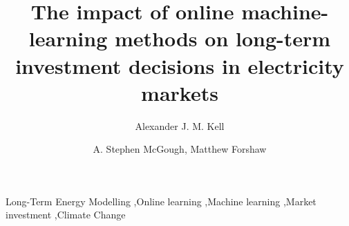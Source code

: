 \documentclass[final,3p,times,twocolumn,numbers]{elsarticle}
\begin{document}
\begin{frontmatter}


 \title{The impact of online machine-learning methods on long-term investment decisions in electricity markets}
 \author{Alexander J. M. Kell}



\author{A. Stephen McGough, Matthew Forshaw}

\address{School of Computing, Newcastle University, Newcastle-upon-Tyne, United Kingdom}

\begin{abstract}

\end{abstract}
%
%

\begin{keyword}
Long-Term Energy Modelling \sep Online learning \sep Machine learning \sep Market investment \sep Climate Change


\end{keyword}

\end{frontmatter}
\end{document}
